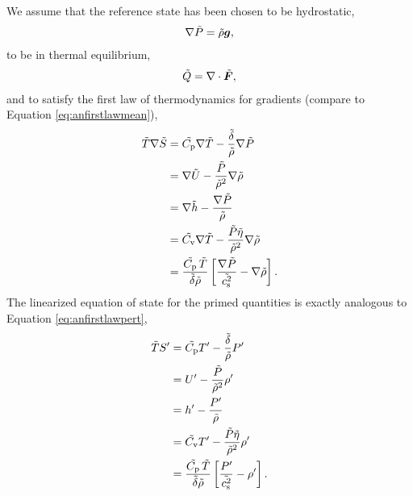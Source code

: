 \documentclass[12pt]{article}
\newcommand{\vecf}{\bm{F}}
\begin{document}
We assume that the reference state has been chosen to be hydrostatic,
\begin{align}\label{eq:refhydro}
	\nabla \tilde{P} = \tilde{\rho}\bm{g},
\end{align}
to be in thermal equilibrium,
\begin{align}\label{eq:refthermalequil}
	\tilde{Q} = \Div\tilde{\vecf},
\end{align}
and to satisfy the first law of thermodynamics for gradients (compare to Equation \eqref{eq:anfirstlawmean}),
  \begin{subequations}\label{eq:reffirstlawmean}
	\begin{align}
		\tilde{T} \nabla\tilde{S} &= \tilde{C_{\rm{p}}} \nabla\tilde{T} - \frac{\tilde{\delta}}{\tilde{\rho}} \nabla\tilde{P}\label{eq:reffirstlawmeantmpprs}\\
		&= \nabla\tilde{U} - \frac{\tilde{P}}{\tilde{\rho}^2}\nabla\tilde{\rho} \label{eq:reffirstlawmeaninterho}\\
		&= \nabla \tilde{h} - \frac{\nabla\tilde{P}}{\tilde{\rho}}\label{eq:reffirstlawmeanenthprs}\\
		&= \tilde{C_{\rm{v}}} \nabla\tilde{T} - \frac{\tilde{P}\tilde{\eta}}{\tilde{\rho}^2}\nabla\tilde{\rho}\label{eq:reffirstlawmeantmprho}\\		
		&= \frac{\tilde{C_{\rm{p}}}\, \tilde{T}}{\tilde{\delta}\tilde{\rho}}\left[\frac{\nabla\tilde{P}}{\tilde{c_{\rm s}^2}}-\nabla\tilde{\rho}\right].\label{eq:reffirstlawmeanprsrho}
	\end{align}
\end{subequations}
The linearized equation of state for the primed quantities is exactly analogous to Equation \eqref{eq:anfirstlawpert},
  \begin{subequations}\label{eq:reffirstlawpert}
	\begin{align}
		\tilde{T} {S^\prime} &= \tilde{C_{\rm{p}}} {T^\prime} - \frac{\tilde{\delta}}{\tilde{\rho}} {P^\prime}\label{eq:reffirstlawperttmpprs}\\
		&= {U^\prime} - \frac{\tilde{P}}{\tilde{\rho}^2}{\rho^\prime} \label{eq:reffirstlawpertinterho}\\
		&= {h^\prime} - \frac{{P^\prime}}{\tilde{\rho}}\label{eq:reffirstlawwpthprs}\\
		&= \tilde{C_{\rm{v}}} {T^\prime} - \frac{\tilde{P}\tilde{\eta}}{\tilde{\rho}^2}{\rho^\prime}\label{eq:reffirstlawperttmprho}\\		
		&= \frac{\tilde{C_{\rm{p}}}\, \tilde{T}}{\tilde{\delta}\tilde{\rho}}\left[\frac{{P^\prime}}{\tilde{c_{\rm s}^2}}-{\rho^\prime}\right].\label{eq:reffirstlawpertprsrho}
	\end{align}
\end{subequations}
\end{document}
